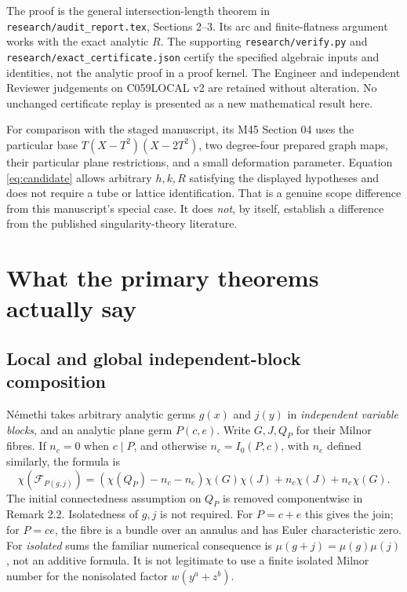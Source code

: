 \documentclass[11pt]{article}
\newcommand{\MF}{\mathcal F}
\begin{document}
The proof is the general intersection-length theorem in
\texttt{research/audit\_report.tex}, Sections 2--3.  Its arc and
finite-flatness argument works with the exact analytic \(R\).
The supporting \texttt{research/verify.py} and
\texttt{research/exact\_certificate.json} certify the specified algebraic
inputs and identities, not the analytic proof in a proof kernel.
The Engineer and independent Reviewer judgements on C059LOCAL v2
are retained without alteration.  No unchanged certificate replay is
presented as a new mathematical result here.

For comparison with the staged manuscript, its M45 Section 04
uses the particular base \(T(X-T^2)(X-2T^2)\), two degree-four
prepared graph maps, their particular plane restrictions, and a
small deformation parameter.  Equation \eqref{eq:candidate}
allows arbitrary \(h,k,R\) satisfying the displayed hypotheses and
does not require a tube or lattice identification.  That is a genuine
scope difference from this manuscript's special case.  It does
\emph{not}, by itself, establish a difference from the published
singularity-theory literature.

\section{What the primary theorems actually say}

\subsection{Local and global independent-block composition}

N\'emethi \cite[Theorem L1 and Corollary 2.3, pp.~2--3]{nemethi80}
takes arbitrary analytic germs \(g(x)\) and \(j(y)\) in
\emph{independent variable blocks}, and an analytic plane germ
\(P(c,e)\).  Write \(G,J,Q_P\) for their Milnor fibres.
If \(n_c=0\) when \(c\mid P\), and otherwise
\(n_c=I_0(P,c)\), with \(n_e\) defined similarly, the formula is
\begin{equation}\label{eq:local-ts}
 \chi(\MF_{P(g,j)})=
 (\chi(Q_P)-n_c-n_e)\chi(G)\chi(J)
       +n_c\chi(J)+n_e\chi(G).
\end{equation}
The initial connectedness assumption on \(Q_P\) is removed
componentwise in Remark 2.2.  Isolatedness of \(g,j\) is not required.
For \(P=c+e\) this gives the join; for \(P=ce\), the fibre is a
bundle over an annulus and has Euler characteristic zero.
For \emph{isolated} sums the familiar numerical consequence is
\(\mu(g+j)=\mu(g)\mu(j)\), not an additive formula.
It is not legitimate to use a finite isolated Milnor number for
the nonisolated factor \(w(y^a+z^b)\).
\end{document}
